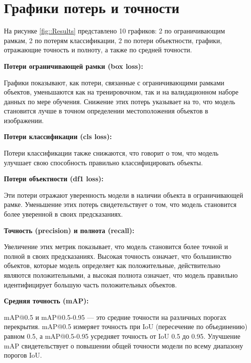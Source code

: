 \section{Графики потерь и точности}

На рисунке \ref{fig::Results} представлено 10 графиков: 2 по ограничивающим рамкам, 2 по
потерям классификации, 2 по потери объектности, графики, отражающие точность и полноту, а
также по средней точности. 


\textbf{Потери ограничивающей рамки (box loss):}

Графики показывают, как потери, связанные с ограничивающими рамками объектов, уменьшаются как на тренировочном, так и на валидационном наборе данных по мере обучения.
Снижение этих потерь указывает на то, что модель становится лучше в точном определении местоположения объектов в изображении.

\textbf{Потери классификации (cls loss):}

Потери классификации также снижаются, что говорит о том, что модель улучшает свою способность правильно классифицировать объекты.

\textbf{Потери объектности (df1 loss):}

Эти потери отражают уверенность модели в наличии объекта в ограничивающей рамке. Уменьшение этих потерь свидетельствует о том, что модель становится более уверенной в своих предсказаниях.

\textbf{Точность (precision) и полнота (recall):}

Увеличение этих метрик показывает, что модель становится более точной и полной в своих предсказаниях. Высокая точность означает, что большинство объектов, которые модель определяет как положительные, действительно являются положительными, а высокая полнота означает, что модель правильно идентифицирует большую часть положительных объектов.

\textbf{Средняя точность (mAP):}

mAP@0.5 и mAP@0.5-0.95 — это средние точности на различных порогах перекрытия. mAP@0.5 измеряет точность при IoU (пересечение по объединению) равном 0.5, а mAP@0.5-0.95 усредняет точность от IoU 0.5 до 0.95.
Улучшение mAP свидетельствует о повышении общей точности модели по всему диапазону порогов IoU.

